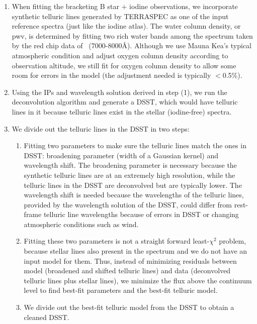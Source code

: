 \begin{enumerate}
\item When fitting the bracketing B star $+$ iodine observations, we
  incorporate synthetic telluric lines generated by TERRASPEC as one of
  the input reference spectra (just like the iodine atlas). The water
  column density, or pwv, is determined by fitting two rich water bands
  among the spectrum taken by the red chip data of \keck\
  (7000-8000\AA). Although we use Mauna Kea's typical atmospheric
  condition and adjust oxygen column density according to observation
  altitude, we still fit for oxygen column density to allow some room
  for errors in the model (the adjustment needed is typically $<$0.5\%).
\item Using the IPs and wavelength solution derived in step (1), we
  run the deconvolution algorithm and generate a DSST, which would
  have telluric lines in it because telluric lines exist in the
  stellar (iodine-free) spectra.
\item We divide out the telluric lines in the DSST in two steps: 
  \begin{enumerate}
  \item Fitting two parameters to make sure the telluric lines match
    the ones in DSST: broadening parameter (width of a Gaussian
    kernel) and wavelength shift. The broadening parameter is
    necessary because the synthetic telluric lines are at an extremely
    high resolution, while the telluric lines in the DSST are
    deconvolved but are typically lower. The wavelength shift is
    needed because the wavelengths of the telluric lines, provided by
    the wavelength solution of the DSST, could differ from rest-frame
    telluric line wavelengths because of errors in DSST or changing
    atmospheric conditions such as wind. 
  \item Fitting these two parameters is not a straight forward
    least-$\chi^2$ problem, because stellar lines also present in the
    spectrum and we do not have an input model for them. Thus, instead
    of minimizing residuals between model (broadened and shifted
    telluric lines) and data (deconvolved telluric lines plus stellar
    lines), we minimize the flux above the continuum level to find
    best-fit parameters and the best-fit telluric model.
  \item We divide out the best-fit telluric model from the DSST to
    obtain a cleaned DSST.
  \end{enumerate}
\end{enumerate}

